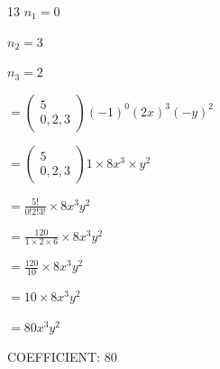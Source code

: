 \documentclass[12 pt]{article}
\begin{document}
\begin{exercise}{13}
    $n_1 = 0$
    
    $n_2 = 3$

    $n_3 = 2$

    $= \begin{pmatrix}
        5 \\
        0, 2, 3
    \end{pmatrix}(-1)^0 (2x)^3 (-y)^2$

    $= \begin{pmatrix}
        5 \\
        0, 2, 3
    \end{pmatrix} 1 \times 8x^3 \times y^2$

    $= \frac{5!}{0!2!3!} \times 8x^3 y^2$

    $= \frac{120}{1 \times 2 \times 6} \times 8x^3 y^2$

    $= \frac{120}{10} \times 8x^3 y^2$

    $= 10 \times 8x^3 y^2$

    $= 80x^3 y^2$

    COEFFICIENT: 80  
    \end{exercise}
\end{document}
